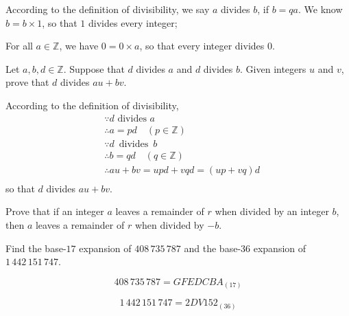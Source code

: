 \begin{solution}
According to the definition of divisibility, we say $a$ divides $b$, if $b=qa$. We know $b=b\times1$, so that $1$ divides every integer; 

For all $a \in \mathbb{Z}$, we have $0=0\times a$, so that every integer divides $0$. 
\end{solution}


\begin{exercise}
\label{exDivisibilityIsLinear}
Let $a,b,d \in \mathbb{Z}$. Suppose that $d$ divides $a$ and $d$ divides $b$. Given integers $u$ and $v$, prove that $d$ divides $au+bv$.
\end{exercise}

\begin{solution}
According to the definition of divisibility, 
\begin{align*}
&\because d \text{ divides } a\\
&\therefore a=pd \quad(p \in \mathbb{Z})\\
&\because d \,\text{ divides }\, b\\
&\therefore b=qd \quad(q \in \mathbb{Z})\\
&\therefore au+bv = upd + vqd = (up+vq)d\\ 
\end{align*}
so that $d$ divides $au+bv$.
\end{solution}


\begin{exercise}
Prove that if an integer $a$ leaves a remainder of $r$ when divided by an integer $b$, then $a$ leaves a remainder of $r$ when divided by $-b$.
\end{exercise}


\begin{exercise}
Find the base-$17$ expansion of $408\,735\,787$ and the base-$36$ expansion of $1\,442\,151\,747$.
\end{exercise}

\begin{solution}

\[408\,735\,787 = GFEDCBA_{(17)}\]

\[1\,442\,151\,747 = 2DV152_{(36)}\]
\end{solution}


